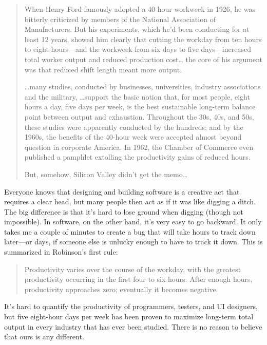 \documentclass[10pt,letterpaper]{article}
\begin{document}
\begin{quotation}

  When Henry Ford famously adopted a 40-hour workweek in 1926, he was
  bitterly criticized by members of the National Association of
  Manufacturers.  But his experiments, which he'd been conducting for
  at least 12 years, showed him clearly that cutting the workday from
  ten hours to eight hours---and the workweek from six days to five
  days---increased total worker output and reduced production cost{\ldots}
  the core of his argument was that reduced shift length meant more
  output.

  {\ldots}many studies, conducted by businesses, universities,
  industry associations and the military, {\ldots}support the basic
  notion that, for most people, eight hours a day, five days per week,
  is the best sustainable long-term balance point between output and
  exhaustion.  Throughout the 30s, 40s, and 50s, these studies were
  apparently conducted by the hundreds; and by the 1960s, the benefits
  of the 40-hour week were accepted almost beyond question in
  corporate America.  In 1962, the Chamber of Commerce even published
  a pamphlet extolling the productivity gains of reduced hours.

  But, somehow, Silicon Valley didn't get the memo{\ldots}

\end{quotation}

Everyone knows that designing and building software is a creative act
that requires a clear head, but many people then act as if it was like digging a
ditch.  The big difference is that it's hard to lose ground when digging (though
not impossible).  In software, on the other hand, it's very easy to go backward.
It only takes me a couple of minutes to create a bug that will take hours to
track down later---or days, if someone else is unlucky enough to have to track
it down.  This is summarized in Robinson's first rule:

\begin{quotation}

  Productivity varies over the course of the workday, with the
  greatest productivity occurring in the first four to six hours.
  After enough hours, productivity approaches zero; eventually it
  becomes negative.

\end{quotation}

It's hard to quantify the productivity of programmers, testers, and UI
designers, but five eight-hour days per week has been proven to maximize
long-term total output in every industry that has ever been studied. There is no
reason to believe that ours is any different.
\end{document}
